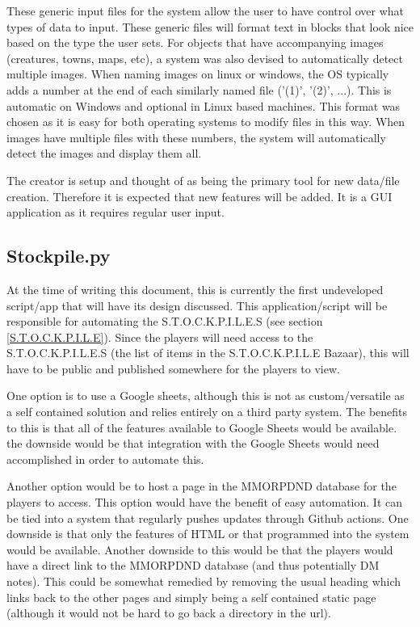 These generic input files for the system allow the user to have control over what types of data to input. These generic files will format text in blocks that look nice based on the type the user sets. For objects that have accompanying images (creatures, towns, maps, etc), a system was also devised to automatically detect multiple images. When naming images on linux or windows, the OS typically adds a number at the end of each similarly named file ('(1)', '(2)', ...). This is automatic on Windows and optional in Linux based machines. This format was chosen as it is easy for both operating systems to modify files in this way. When images have multiple files with these numbers, the system will automatically detect the images and display them all. 

The creator is setup and thought of as being the primary tool for new data/file creation. Therefore it is expected that new features will be added. It is a GUI application as it requires regular user input.




\subsection{Stockpile.py}

At the time of writing this document, this is currently the first undeveloped script/app that will have its design discussed. This application/script will be responsible for automating the S.T.O.C.K.P.I.L.E.S (see section \ref{S.T.O.C.K.P.I.L.E}). Since the players will need access to the S.T.O.C.K.P.I.L.E.S (the list of items in the S.T.O.C.K.P.I.L.E Bazaar), this will have to be public and published somewhere for the players to view. 

One option is to use a Google sheets, although this is not as custom/versatile as a self contained solution and relies entirely on a third party system. The benefits to this is that all of the features available to Google Sheets would be available. the downside would be that integration with the Google Sheets would need accomplished in order to automate this.

Another option would be to host a page in the MMORPDND database for the players to access. This option would have the benefit of easy automation. It can be tied into a system that regularly pushes updates through Github actions. One downside is that only the features of HTML or that programmed into the system would be available. Another downside to this would be that the players would have a direct link to the MMORPDND database (and thus potentially DM notes). This could be somewhat remedied by removing the usual heading which links back to the other pages and simply being a self contained static page (although it would not be hard to go back a directory in the url).

